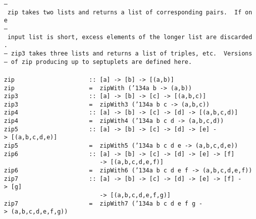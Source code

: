 \eprogB\noindent\bprogB
\mbox{\tt --\ zip\ takes\ two\ lists\ and\ returns\ a\ list\ of\ corresponding\ pairs.\ \ If\ one}\\
\mbox{\tt --\ input\ list\ is\ short,\ excess\ elements\ of\ the\ longer\ list\ are\ discarded.}\\
\mbox{\tt --\ zip3\ takes\ three\ lists\ and\ returns\ a\ list\ of\ triples,\ etc.\ \ Versions}\\
\mbox{\tt --\ of\ zip\ producing\ up\ to\ septuplets\ are\ defined\ here.}\\
\mbox{\tt }\\[-8pt]
\mbox{\tt zip\ \ \ \ \ \ \ \ \ \ \ \ \ \ \ \ \ \ \ \ \ ::\ [a]\ ->\ [b]\ ->\ [(a,b)]}\\
\mbox{\tt zip\ \ \ \ \ \ \ \ \ \ \ \ \ \ \ \ \ \ \ \ \ =\ \ zipWith\ ({\char'134}a\ b\ ->\ (a,b))}
%
\eprogB\noindent\bprogB
\mbox{\tt zip3\ \ \ \ \ \ \ \ \ \ \ \ \ \ \ \ \ \ \ \ ::\ [a]\ ->\ [b]\ ->\ [c]\ ->\ [(a,b,c)]}\\
\mbox{\tt zip3\ \ \ \ \ \ \ \ \ \ \ \ \ \ \ \ \ \ \ \ =\ \ zipWith3\ ({\char'134}a\ b\ c\ ->\ (a,b,c))}
%
\eprogB\noindent\bprogB
\mbox{\tt zip4\ \ \ \ \ \ \ \ \ \ \ \ \ \ \ \ \ \ \ \ ::\ [a]\ ->\ [b]\ ->\ [c]\ ->\ [d]\ ->\ [(a,b,c,d)]}\\
\mbox{\tt zip4\ \ \ \ \ \ \ \ \ \ \ \ \ \ \ \ \ \ \ \ =\ \ zipWith4\ ({\char'134}a\ b\ c\ d\ ->\ (a,b,c,d))}
%
\eprogB\noindent\bprogB
\mbox{\tt zip5\ \ \ \ \ \ \ \ \ \ \ \ \ \ \ \ \ \ \ \ ::\ [a]\ ->\ [b]\ ->\ [c]\ ->\ [d]\ ->\ [e]\ ->\ [(a,b,c,d,e)]}\\
\mbox{\tt zip5\ \ \ \ \ \ \ \ \ \ \ \ \ \ \ \ \ \ \ \ =\ \ zipWith5\ ({\char'134}a\ b\ c\ d\ e\ ->\ (a,b,c,d,e))}
%
\eprogB\noindent\bprogB
\mbox{\tt zip6\ \ \ \ \ \ \ \ \ \ \ \ \ \ \ \ \ \ \ \ ::\ [a]\ ->\ [b]\ ->\ [c]\ ->\ [d]\ ->\ [e]\ ->\ [f]}\\
\mbox{\tt \ \ \ \ \ \ \ \ \ \ \ \ \ \ \ \ \ \ \ \ \ \ \ \ \ \ \ ->\ [(a,b,c,d,e,f)]}\\
\mbox{\tt zip6\ \ \ \ \ \ \ \ \ \ \ \ \ \ \ \ \ \ \ \ =\ \ zipWith6\ ({\char'134}a\ b\ c\ d\ e\ f\ ->\ (a,b,c,d,e,f))}
%
\eprogB\noindent\bprogB
\mbox{\tt zip7\ \ \ \ \ \ \ \ \ \ \ \ \ \ \ \ \ \ \ \ ::\ [a]\ ->\ [b]\ ->\ [c]\ ->\ [d]\ ->\ [e]\ ->\ [f]\ ->\ [g]}\\
\mbox{\tt \ \ \ \ \ \ \ \ \ \ \ \ \ \ \ \ \ \ \ \ \ \ \ \ \ \ \ ->\ [(a,b,c,d,e,f,g)]}\\
\mbox{\tt zip7\ \ \ \ \ \ \ \ \ \ \ \ \ \ \ \ \ \ \ \ =\ \ zipWith7\ ({\char'134}a\ b\ c\ d\ e\ f\ g\ ->\ (a,b,c,d,e,f,g))}
